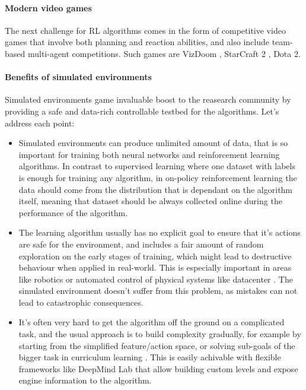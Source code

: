 
\paragraph{Modern video games}
The next challenge for RL algorithms comes in the form of competitive video games that involve
both planning and reaction abilities, and also include team-based multi-agent competitions.
Such games are VizDoom \cite{Kempka2016ViZDoom}, StarCraft 2 \cite{vinyals2017starcraft}, Dota 2.


\paragraph{Benefits of simulated environments}
Simulated environments game invaluable boost to the reasearch community by providing a
safe and data-rich controllable testbed for the algorithms. Let's address each point:
\begin{itemize}
    \item Simulated environments can produce unlimited amount of data, that is so important
    for training both neural networks and reinforcement learning algorithms. In contrast to
    supervised learning where one dataset with labels is enough for training any algorithm,
    in on-policy reinforcement learning the data should come from the distribution that is
    dependant on the algorithm itself, meaning that dataset should be always collected online
    during the performance of the algorithm.

    \item The learning algorithm usually has no explicit goal to ensure that it's actions are
    safe for the environment, and includes a fair amount of random exploration on the early
    stages of training, which might lead to destructive behaviour when applied in real-world.
    This is especially important in areas like robotics or automated control of physical systems
    like datacenter \cite{gao2014machine}. The simulated environment doesn't suffer from this problem,
    as mistakes can not lead to catastrophic consequences.

    \item It's often very hard to get the algorithm off the ground on a complicated task,
    and the usual approach is to build complexity gradually, for example by starting from the
    simplified feature/action space, or solving sub-goals of the bigger task in curriculum
    learning \cite{wu2016training}. This is easily achivable with flexible frameworks like
    DeepMind Lab \cite{beattie2016deepmind} that allow building custom levels and expose engine
    information to the algorithm.
\end{itemize}

